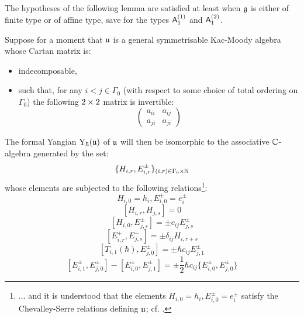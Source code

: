        The hypotheses of the following lemma are satisfied at least when $\mathfrak{g}$ is either of finite type or of affine type, save for the types $\mathsf{A}_1^{(1)}$ and $\mathsf{A}_1^{(2)}$.
        \begin{lemma} \label{lemma: levendorskii_presentation}
            \cite[Theorem 2.13]{guay_nakajima_wendlandt_affine_yangian_coproduct} Suppose for a moment that $\mathfrak{u}$ is a general symmetrisable Kac-Moody algebra whose Cartan matrix is:
            \begin{itemize}
                \item indecomposable,
                \item such that, for any $i < j \in \Gamma_0$ (with respect to some choice of total ordering on $\Gamma_0$) the following $2 \x 2$ matrix is invertible:
                    $$
                        \begin{pmatrix}
                            a_{ii} & a_{ij}
                            \\
                            a_{ji} & a_{ji}
                        \end{pmatrix}
                    $$
            \end{itemize}
            The formal Yangian $\mathrm{Y}_{\hbar}(\mathfrak{u})$ of $\mathfrak{u}$ will then be isomorphic to the associative $\mathbb{C}$-algebra generated by the set:
                $$\{ H_{i, r}, E_{i, r}^{\pm} \}_{(i, r) \in \Gamma_0 \x \N}$$
            whose elements are subjected to the following relations\footnote{... and it is understood that the elements $H_{i, 0} = h_i, E_{i, 0}^{\pm} = e_i^{\pm}$ satisfy the Chevalley-Serre relations defining $\mathfrak{u}$; cf. \cite[Chapter 1]{kac_infinite_dimensional_lie_algebras}.}:
                $$H_{i, 0} = h_i, E_{i, 0}^{\pm} = e_i^{\pm}$$
                $$[ H_{i, r}, H_{j, s} ] = 0$$
                $$[ H_{i, 0}, E_{j, s}^{\pm} ] = \pm c_{ij} E_{j, s}^{\pm}$$
                $$[ E_{i, r}^+, E_{j, s}^- ] = \pm \delta_{ij} H_{i, r + s}$$
                $$\left[ T_{i, 1}(\hbar), E_{j, 0}^{\pm} \right] = \pm \hbar c_{ij} E_{j, 1}^{\pm}$$
                $$[ E_{i, 1}^{\pm}, E_{j, 0}^{\pm} ] - [ E_{i, 0}^{\pm}, E_{j, 1}^{\pm} ] = \pm \frac12 \hbar c_{ij} \{E_{i, 0}^{\pm}, E_{j, 0}^{\pm}\}$$
        \end{lemma}
